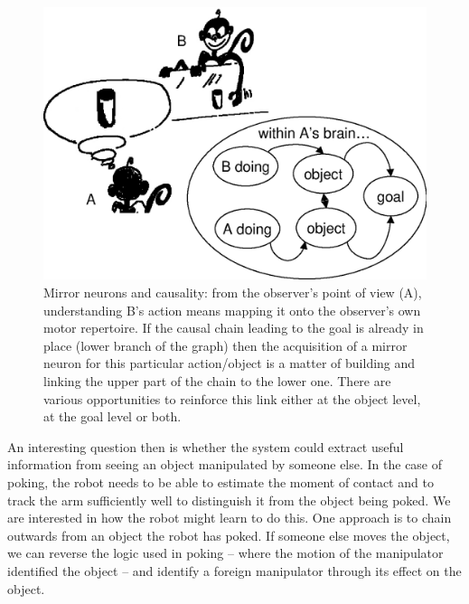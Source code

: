 \ifverbose
\begin{figure}[tb]
\begin{center}
\includegraphics[width=\columnwidth]{mirror-monkey.eps}
\caption{ 
\label{fig:mirror-monkey}
%
Mirror neurons and causality: from the observer's point
of view (A), understanding B's action means mapping it onto the
observer's own
motor repertoire. If the causal chain leading to the goal is already
in place (lower branch of the graph) then the acquisition of a
mirror neuron for this particular action/object is a matter of
building and linking the upper part of the chain to the lower one.
There are various opportunities to reinforce this link either at the object
level, at the goal level or both. 
%
}
\end{center}
\end{figure}
\fi

An interesting question then is
whether the system could extract useful information from seeing an
object manipulated by someone else.  In the case of poking, the robot
needs to be able to estimate the moment of contact and to track the arm
sufficiently well to distinguish it from the object being poked.  We
are interested in how the robot might learn to do this.  One approach
is to chain outwards from an object the robot has poked.  If someone
else moves the object, we can reverse the logic used in poking --
where the motion of the manipulator identified the object -- and
identify a foreign manipulator through its effect on the object.






